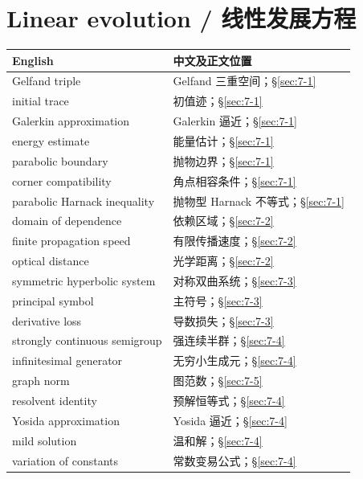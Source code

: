 \section*{Linear evolution / 线性发展方程}
\begin{center}\small
\begin{tabular}{@{}p{.53\linewidth}p{.38\linewidth}@{}}
\textbf{English}&\textbf{中文及正文位置}\\\hline
Gelfand triple & Gelfand 三重空间；\S\ref{sec:7-1}\\
initial trace & 初值迹；\S\ref{sec:7-1}\\
Galerkin approximation & Galerkin 逼近；\S\ref{sec:7-1}\\
energy estimate & 能量估计；\S\ref{sec:7-1}\\
parabolic boundary & 抛物边界；\S\ref{sec:7-1}\\
corner compatibility & 角点相容条件；\S\ref{sec:7-1}\\
parabolic Harnack inequality & 抛物型 Harnack 不等式；\S\ref{sec:7-1}\\
domain of dependence & 依赖区域；\S\ref{sec:7-2}\\
finite propagation speed & 有限传播速度；\S\ref{sec:7-2}\\
optical distance & 光学距离；\S\ref{sec:7-2}\\
symmetric hyperbolic system & 对称双曲系统；\S\ref{sec:7-3}\\
principal symbol & 主符号；\S\ref{sec:7-3}\\
derivative loss & 导数损失；\S\ref{sec:7-3}\\
strongly continuous semigroup & 强连续半群；\S\ref{sec:7-4}\\
infinitesimal generator & 无穷小生成元；\S\ref{sec:7-4}\\
graph norm & 图范数；\S\ref{sec:7-5}\\
resolvent identity & 预解恒等式；\S\ref{sec:7-4}\\
Yosida approximation & Yosida 逼近；\S\ref{sec:7-4}\\
mild solution & 温和解；\S\ref{sec:7-4}\\
variation of constants & 常数变易公式；\S\ref{sec:7-4}
\end{tabular}
\end{center}
\clearpage
